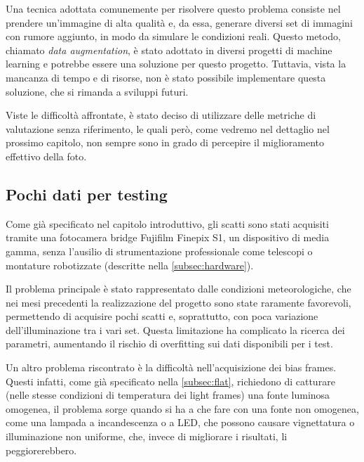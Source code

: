 Una tecnica adottata comunemente per risolvere questo problema consiste nel prendere un'immagine di alta qualità e, da essa, generare diversi set di immagini con rumore aggiunto, in modo da simulare le condizioni reali. Questo metodo, chiamato \textit{data augmentation}, è stato adottato in diversi progetti di machine learning e potrebbe essere una soluzione per questo progetto. Tuttavia, vista la mancanza di tempo e di risorse, non è stato possibile implementare questa soluzione, che si rimanda a sviluppi futuri.

Viste le difficoltà affrontate, è stato deciso di utilizzare delle metriche di valutazione senza riferimento, le quali però, come vedremo nel dettaglio nel prossimo capitolo, non sempre sono in grado di percepire il miglioramento effettivo della foto.

\subsection{Pochi dati per testing}

Come già specificato nel capitolo introduttivo, gli scatti sono stati acquisiti tramite una fotocamera bridge Fujifilm Finepix S1, un dispositivo di media gamma, senza l'ausilio di strumentazione professionale come telescopi o montature robotizzate (descritte nella \cref{subsec:hardware}).

Il problema principale è stato rappresentato dalle condizioni meteorologiche, che nei mesi precedenti la realizzazione del progetto sono state raramente favorevoli, permettendo di acquisire pochi scatti e, soprattutto, con poca variazione dell'illuminazione tra i vari set. Questa limitazione ha complicato la ricerca dei parametri, aumentando il rischio di overfitting sui dati disponibili per i test.

Un altro problema riscontrato è la difficoltà nell'acquisizione dei bias frames. Questi infatti, come già specificato nella \cref{subsec:flat}, richiedono di catturare (nelle stesse condizioni di temperatura dei light frames) una fonte luminosa omogenea, il problema sorge quando si ha a che fare con una fonte non omogenea, come una lampada a incandescenza o a LED, che possono causare vignettatura o illuminazione non uniforme, che, invece di migliorare i risultati, li peggiorerebbero.

\cleardoublepage